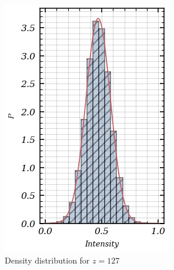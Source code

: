 \documentclass[11pt,a4paper]{report}
\begin{document}
\begin{multicols*}{2}
\begin{figure}[H]
\begin{subfigure}[b]{.48\linewidth}
        \end{subfigure}
        \hfill
        \begin{subfigure}[b]{.48\linewidth}
            \includegraphics[width=\linewidth]{./figure/density_prim.png}
            \caption{Density distribution for $z = 127$}
        \end{subfigure}

        \caption{}
        \label{}
    \end{figure}



\end{multicols*}
\end{document}
